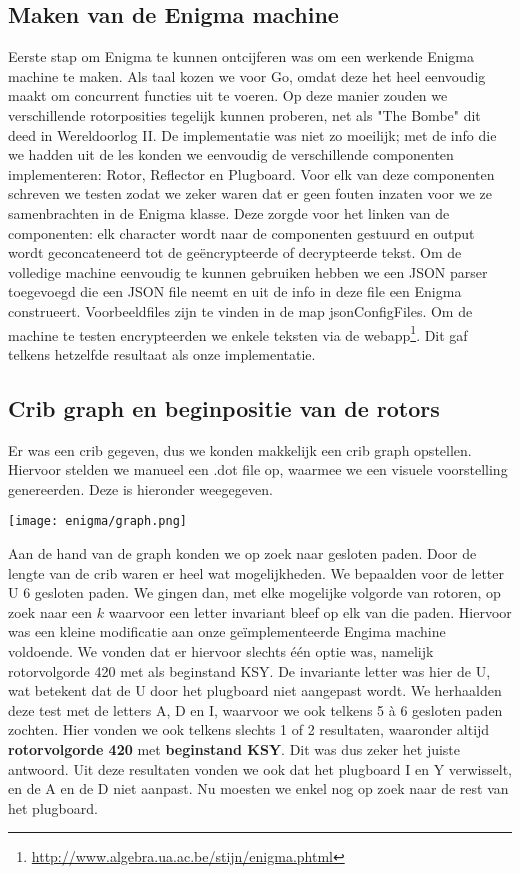 \subsection{Maken van de Enigma machine}
Eerste stap om Enigma te kunnen ontcijferen was om een werkende Enigma machine te maken. Als taal kozen we voor Go, omdat deze het heel eenvoudig maakt om concurrent functies uit te voeren. Op deze manier zouden we verschillende rotorposities tegelijk kunnen proberen, net als "The Bombe" dit deed in Wereldoorlog II. De implementatie was niet zo moeilijk; met de info die we hadden uit de les konden we eenvoudig de verschillende componenten implementeren: Rotor, Reflector en Plugboard. Voor elk van deze componenten schreven we testen zodat we zeker waren dat er geen fouten inzaten voor we ze samenbrachten in de Enigma klasse. Deze zorgde voor het linken van de componenten: elk character wordt naar de componenten gestuurd en output wordt geconcateneerd tot de ge\"encrypteerde of decrypteerde tekst. Om de volledige machine eenvoudig te kunnen gebruiken hebben we een JSON parser toegevoegd die een JSON file neemt en uit de info in deze file een Enigma construeert. Voorbeeldfiles zijn te vinden in de map jsonConfigFiles. Om de machine te testen encrypteerden we enkele teksten via de webapp\footnote{\url{http://www.algebra.ua.ac.be/stijn/enigma.phtml}}. Dit gaf telkens hetzelfde resultaat als onze implementatie.

\subsection{Crib graph en beginpositie van de rotors}
Er was een crib gegeven, dus we konden makkelijk een crib graph opstellen. Hiervoor stelden we manueel een .dot file op, waarmee we een visuele voorstelling genereerden. Deze is hieronder weegegeven. \\
\begin{center}
\texttt{[image: enigma/graph.png]}
\end{center}  
Aan de hand van de graph konden we op zoek naar gesloten paden. Door de lengte van de crib waren er heel wat mogelijkheden. We bepaalden voor de letter U 6 gesloten paden. We gingen dan, met elke mogelijke volgorde van rotoren, op zoek naar een $k$ waarvoor een letter invariant bleef op elk van die paden. Hiervoor was een kleine modificatie aan onze ge\"implementeerde Engima machine voldoende. We vonden dat er hiervoor slechts \'e\'en optie was, namelijk rotorvolgorde 420 met als beginstand KSY. De invariante letter was hier de U, wat betekent dat de U door het plugboard niet aangepast wordt. We herhaalden deze test met de letters A, D en I, waarvoor we ook telkens 5 \`a 6 gesloten paden zochten. Hier vonden we ook telkens slechts 1 of 2 resultaten, waaronder altijd \textbf{rotorvolgorde 420} met \textbf{beginstand KSY}. Dit was dus zeker het juiste antwoord. Uit deze resultaten vonden we ook dat het plugboard I en Y verwisselt, en de A en de D niet aanpast. Nu moesten we enkel nog op zoek naar de rest van het plugboard. 

